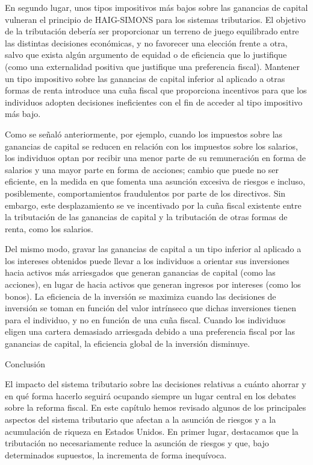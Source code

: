 \documentclass[10pt,a4paper]{article}
\begin{document}
En segundo lugar, unos tipos impositivos más bajos sobre las ganancias de capital vulneran el principio de HAIG-SIMONS para los sistemas tributarios. El objetivo de la tributación debería ser proporcionar un terreno de juego equilibrado entre las distintas decisiones económicas, y no favorecer una elección frente a otra, salvo que exista algún argumento de equidad o de eficiencia que lo justifique (como una externalidad positiva que justifique una preferencia fiscal). Mantener un tipo impositivo sobre las ganancias de capital inferior al aplicado a otras formas de renta introduce una cuña fiscal que proporciona incentivos para que los individuos adopten decisiones ineficientes con el fin de acceder al tipo impositivo más bajo.

Como se señaló anteriormente, por ejemplo, cuando los impuestos sobre las ganancias de capital se reducen en relación con los impuestos sobre los salarios, los individuos optan por recibir una menor parte de su remuneración en forma de salarios y una mayor parte en forma de acciones; cambio que puede no ser eficiente, en la medida en que fomenta una asunción excesiva de riesgos e incluso, posiblemente, comportamientos fraudulentos por parte de los directivos. Sin embargo, este desplazamiento se ve incentivado por la cuña fiscal existente entre la tributación de las ganancias de capital y la tributación de otras formas de renta, como los salarios.

Del mismo modo, gravar las ganancias de capital a un tipo inferior al aplicado a los intereses obtenidos puede llevar a los individuos a orientar sus inversiones hacia activos más arriesgados que generan ganancias de capital (como las acciones), en lugar de hacia activos que generan ingresos por intereses (como los bonos). La eficiencia de la inversión se maximiza cuando las decisiones de inversión se toman en función del valor intrínseco que dichas inversiones tienen para el individuo, y no en función de una cuña fiscal. Cuando los individuos eligen una cartera demasiado arriesgada debido a una preferencia fiscal por las ganancias de capital, la eficiencia global de la inversión disminuye.












Conclusión

El impacto del sistema tributario sobre las decisiones relativas a cuánto ahorrar y en qué forma hacerlo seguirá ocupando siempre un lugar central en los debates sobre la reforma fiscal. En este capítulo hemos revisado algunos de los principales aspectos del sistema tributario que afectan a la asunción de riesgos y a la acumulación de riqueza en Estados Unidos. En primer lugar, destacamos que la tributación no necesariamente reduce la asunción de riesgos y que, bajo determinados supuestos, la incrementa de forma inequívoca.
\end{document}
